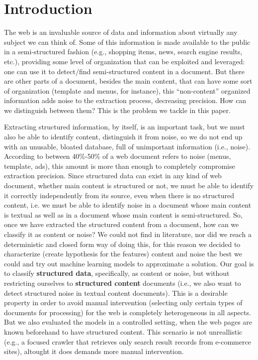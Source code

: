\section{Introduction}
The web is an invaluable source of data and information about virtually any
subject we can think of. Some of this information is made available to the
public in a semi-structured fashion (e.g., shopping items, news, search engine
results, etc.), providing some level of organization that can be exploited and
leveraged: one can use it to detect/find semi-structured content in a document.
But there are other parts of a document, besides the main content, that can have
some sort of organization (template and menus, for instance), this
``non-content'' organized information adds noise to the extraction process,
decreasing precision. How can we distinguish between them? This is the problem
we tackle in this paper.

Extracting structured information, by itself, is an important task, but we must
also be able to identify content, distinguish it from noise, so we do not end up
with an unusable, bloated database, full of unimportant information (i.e.,
noise).
According to \cite{Volume05,TPS2013} between 40\%-50\% of a web document refers
to noise (menus, template, ads), this amount is more than enough to completely
compromise extraction precision.
Since structured data can exist in any kind of web document, whether main
content is structured or not, we must be able to identify it correctly
independently from its source, even when there is no structured content, i.e.
we must be able to identify noise in a document whose main content is textual
as well as in a document whose main content is semi-structured.
So, once we have extracted the structured content from a document, how can we
classify it as content or noise? We could not find in literature, nor did we
reach a deterministic and closed form way of doing this, for this reason we
decided to characterize (create hypothesis for the features) content and noise
the best we could and try out machine learning models to approximate a solution.
Our goal is to classify \textbf{structured data}, specifically, as content or
noise, but without restricting ourselves to \textbf{structured content}
documents (i.e., we also want to detect structured noise in textual content
documents). This is a desirable property in order to avoid manual intervention
(selecting only certain types of documents for processing) for the web is
completely heterogeneous in all aspects. But we also evaluated the models in a
controlled setting, when the web pages are known beforehand to have structured
content. This scenario is not unreallistic (e.g., a focused crawler that
retrieves only search result records from e-commerce sites), altought it does
demands more manual intervention.

